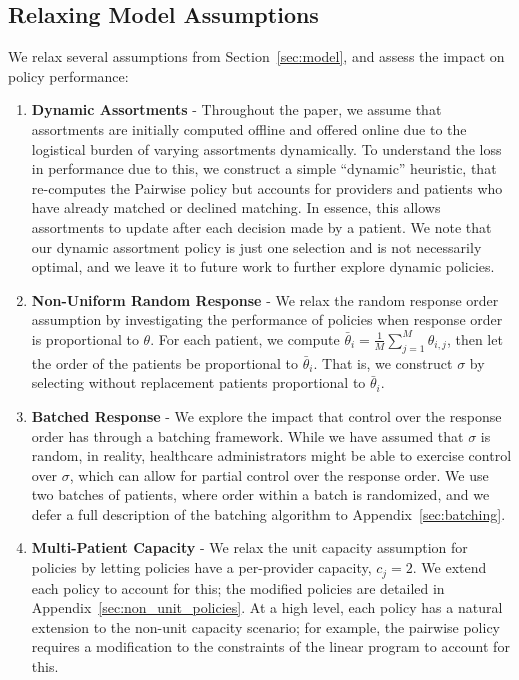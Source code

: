 \documentclass[11pt]{article}
\begin{document}
\subsection{Relaxing Model Assumptions}
\label{sec:assumption_relaxation}
We relax several assumptions from Section~\ref{sec:model}, and assess the impact on policy performance: 
\begin{enumerate}
    \item \textbf{Dynamic Assortments} - Throughout the paper, we assume that assortments are initially computed offline and offered online due to the logistical burden of varying assortments dynamically. To understand the loss in performance due to this, we construct a simple ``dynamic'' heuristic, that re-computes the Pairwise policy but accounts for providers and patients who have already matched or declined matching. In essence, this allows assortments to update after each decision made by a patient. We note that our dynamic assortment policy is just one selection and is not necessarily optimal, and we leave it to future work to further explore dynamic policies. 
    \item \textbf{Non-Uniform Random Response} - We relax the random response order assumption by investigating the performance of policies when response order is proportional to $\theta$. 
    For each patient, we compute $\bar{\theta}_{i} = \frac{1}{M} \sum_{j=1}^{M} \theta_{i,j}$, then let the order of the patients be proportional to $\bar{\theta}_{i}$. 
    That is, we construct $\sigma$ by selecting without replacement patients proportional to $\bar{\theta}_{i}$. 


    \item \textbf{Batched Response} - We explore the impact that control over the response order has through a batching framework. While we have assumed that $\sigma$ is random, in reality, healthcare administrators might be able to exercise control over $\sigma$, which can allow for partial control over the response order. We use two batches of patients, where order within a batch is randomized, and we defer a full description of the batching algorithm to Appendix~\ref{sec:batching}. 

    \item \textbf{Multi-Patient Capacity} - We relax the unit capacity assumption for policies by letting policies have a per-provider capacity, $c_{j}=2$. 
    We extend each policy to account for this; the modified policies are detailed in Appendix~\ref{sec:non_unit_policies}. 
    At a high level, each policy has a natural extension to the non-unit capacity scenario; for example, the pairwise policy requires a modification to the constraints of the linear program to account for this. 
\end{enumerate}
\end{document}
